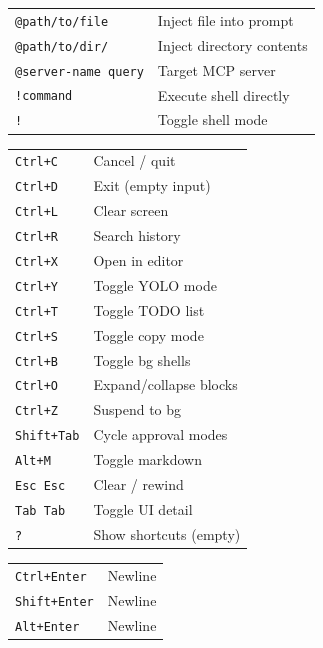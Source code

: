 \documentclass[9pt]{extarticle}
\newcommand{\sect}[1]{\needspace{4\baselineskip}\vspace{6pt}{\footnotesize\bfseries\scshape #1}\par\vspace{2pt}}
\begin{document}
\begin{multicols}{3}
\sect{Special Input}
\begin{tabularx}{\linewidth}{@{}l@{\enspace}Y@{}}
\texttt{@path/to/file}              & Inject file into prompt \\
\texttt{@path/to/dir/}             & Inject directory contents \\
\texttt{@server-name query}         & Target MCP server \\
\texttt{!command}                    & Execute shell directly \\
\texttt{!}                           & Toggle shell mode \\
\end{tabularx}

\sect{Keyboard Shortcuts}
\begin{tabularx}{\linewidth}{@{}l@{\enspace}Y@{}}
\texttt{Ctrl+C}                      & Cancel / quit \\
\texttt{Ctrl+D}                      & Exit (empty input) \\
\texttt{Ctrl+L}                      & Clear screen \\
\texttt{Ctrl+R}                      & Search history \\
\texttt{Ctrl+X}                      & Open in editor \\
\texttt{Ctrl+Y}                      & Toggle YOLO mode \\
\texttt{Ctrl+T}                      & Toggle TODO list \\
\texttt{Ctrl+S}                      & Toggle copy mode \\
\texttt{Ctrl+B}                      & Toggle bg shells \\
\texttt{Ctrl+O}                      & Expand/collapse blocks \\
\texttt{Ctrl+Z}                      & Suspend to bg \\
\texttt{Shift+Tab}                   & Cycle approval modes \\
\texttt{Alt+M}                       & Toggle markdown \\
\texttt{Esc Esc}                     & Clear / rewind \\
\texttt{Tab Tab}                     & Toggle UI detail \\
\texttt{?}                           & Show shortcuts (empty) \\
\end{tabularx}

\sect{Multiline Input}
\begin{tabularx}{\linewidth}{@{}l@{\enspace}Y@{}}
\texttt{Ctrl+Enter}                 & Newline \\
\texttt{Shift+Enter}                & Newline \\
\texttt{Alt+Enter}                   & Newline \\
\end{tabularx}


\end{multicols}
\end{document}
